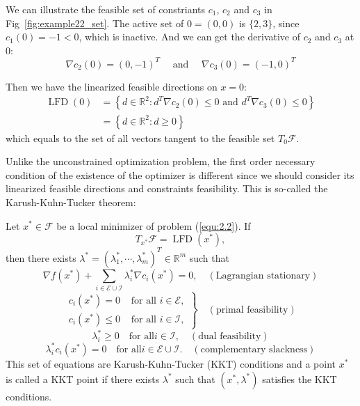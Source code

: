 \par We can illustrate the feasible set of constriants $c_1$, $c_2$ and $c_3$ in Fig~\ref{fig:example22_set}. The active set of $0=(0,0)$ is $\{2, 3\}$, since $c_1(0) = -1 < 0$, which is inactive. And we can get the derivative of $c_2$ and $c_3$ at 0: 
$$
\nabla c_{2}(0)=(0,-1)^{T} \quad \textrm { and } \quad \nabla c_{3}(0)=(-1,0)^{T}
$$
\par Then we have the linearized feasible directions on $x=0$: 
$$
\begin{aligned} \operatorname{LFD}(0) &=\left\{d \in \mathbb{R}^{2}: d^{T} \nabla c_{2}(0) \leq 0 \text { and } d^{T} \nabla c_{3}(0) \leq 0\right\} \\ &=\left\{d \in \mathbb{R}^{2}: d \geq 0\right\} \end{aligned}
$$
which equals to the set of all vectors tangent to the feasible set $T_{0} \mathscr{F}$. 
\par Unlike the unconstrained optimization problem, the first order necessary condition of the existence of the optimizer is different since we should consider its linearized feasible directions and constraints feasibility. This is so-called the Karush-Kuhn-Tucker theorem: 
\begin{thm}
    \label{thm:kkt}
    Let $x^* \in \mathscr{F}$ be a local minimizer of problem (\ref{equ:2.2}). If
    $$
    T_{x^*} \mathscr{F} = \operatorname{LFD}(x^*),
    $$
    then there exists $\lambda^{*}=\left(\lambda_{1}^{*}, \cdots, \lambda_{m}^{*}\right)^{T} \in \mathbb{R}^{m}$ such that 
    $$
    \nabla f\left(x^{*}\right)+\sum_{i \in \mathscr{E} \cup \mathscr{I}} \lambda_{i}^{*} \nabla c_{i}\left(x^{*}\right)=0, \quad(\textrm {Lagrangian stationary})
    $$
    $$
    \left.\begin{array}{ll}c_{i}\left(x^{*}\right)=0 & \text { for all } i \in \mathscr{E}, \\ c_{i}\left(x^{*}\right) \leq 0 & \text { for all } i \in \mathscr{I},\end{array}\right\} \quad(\textrm {primal feasibility})
    $$
    $$
    \lambda_{i}^{*} \geq 0 \quad \textrm {for all} i \in \mathscr{I}, \quad (\textrm {dual feasibility})
    $$
    $$
    \lambda_i^*c_i(x^*) = 0 \quad \textrm {for all} i \in \mathscr{E} \cup \mathscr{I}. \quad (\textrm {complementary slackness})
    $$
    This set of equations are Karush-Kuhn-Tucker (KKT) conditions and a point $x^*$ is called a KKT point if there exists $\lambda^*$ such that $(x^*, \lambda ^*)$ satisfies the KKT conditions.
\end{thm}
